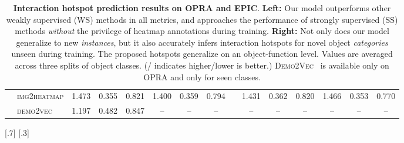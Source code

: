 \documentclass[10pt,twocolumn,letterpaper]{article}
\newcommand{\SC}[1]{{\textsc{#1}}}
\begin{document}
\begin{table*}[t]
{\begin{tabular}{rl|ccc|ccc|c@{\hskip 0.1in}|ccc|ccc|}
\ldelim[{2}{1mm}[{\rotatebox[origin=c]{90}{SS}}]
& \SC{img2heatmap}                       & 1.473            & 0.355          & 0.821            & 1.400            & 0.359          & 0.794            && 1.431            & 0.362          & 0.820           & 1.466           & 0.353          & 0.770             \\ 
& \SC{demo2vec} \cite{fang2018demo2vec}  & 1.197            & 0.482          & 0.847            & --               & --             & --               && --               & --             & --              & --              & --             & --                \\ 
\cmidrule{2-8} \cmidrule{10-15}
\end{tabular}
}
\vskip -0.1in
[.7\linewidth]{}  \hskip -0.7in
[.3\linewidth]{} \vskip -0.1in

\caption{\textbf{Interaction hotspot prediction results on OPRA and EPIC}. \textbf{Left:} Our model outperforms other weakly supervised (WS) methods in all metrics, and approaches the performance of strongly supervised (SS) methods \emph{without} the privilege of heatmap annotations during training. \textbf{Right:} Not only does our model generalize to new \emph{instances}, but it also accurately infers interaction hotspots for novel object \emph{categories} unseen during training. The proposed hotspots generalize on an object-function level. Values are averaged across three splits of object classes. (/ indicates higher/lower is better.)  \SC{Demo2Vec}~\cite{fang2018demo2vec} is available only on OPRA and only for seen classes.}

\label{tbl:hotspot-eval}
\end{table*}
\end{document}
